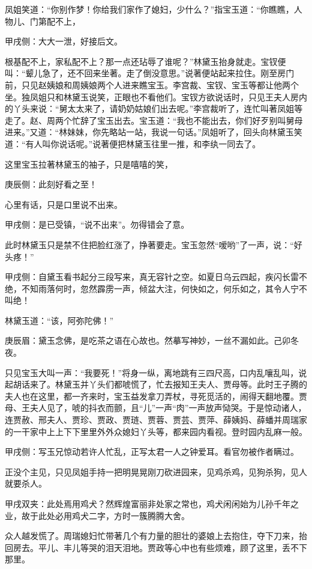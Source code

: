 \begin{parag}
    凤姐笑道：“你别作梦！你给我们家作了媳妇，少什么？”指宝玉道：“你瞧瞧，人物儿、门第配不上，\begin{note}甲戌侧：大大一泄，好接后文。\end{note}根基配不上，家私配不上？那一点还玷辱了谁呢？”林黛玉抬身就走。宝钗便叫：“颦儿急了，还不回来坐著。走了倒没意思。”说著便站起来拉住。刚至房门前，只见赵姨娘和周姨娘两个人进来瞧宝玉。李宫裁、宝钗、宝玉等都让他两个坐。独凤姐只和林黛玉说笑，正眼也不看他们。宝钗方欲说话时，只见王夫人房内的丫头来说：“舅太太来了，请奶奶姑娘们出去呢。”李宫裁听了，连忙叫著凤姐等走了。赵、周两个忙辞了宝玉出去。宝玉道：“我也不能出去，你们好歹别叫舅母进来。”又道：“林妹妹，你先略站一站，我说一句话。”凤姐听了，回头向林黛玉笑道：“有人叫你说话呢。”说著便把林黛玉往里一推，和李纨一同去了。
\end{parag}


\begin{parag}
    这里宝玉拉著林黛玉的袖子，只是嘻嘻的笑，\begin{note}庚辰侧：此刻好看之至！\end{note}心里有话，只是口里说不出来。\begin{note}甲戌侧：是已受镇，“说不出来”。勿得错会了意。\end{note}此时林黛玉只是禁不住把脸红涨了，挣著要走。宝玉忽然“嗳哟”了一声，说：“好头疼！”\begin{note}甲戌侧：自黛玉看书起分三段写来，真无容针之空。如夏日乌云四起，疾闪长雷不绝，不知雨落何时，忽然霹雳一声，倾盆大注，何快如之，何乐如之，其令人宁不叫绝！\end{note}林黛玉道：“该，阿弥陀佛！”\begin{note}庚辰眉：黛玉念佛，是吃茶之语在心故也。然摹写神妙，一丝不漏如此。己卯冬夜。\end{note}只见宝玉大叫一声：“我要死！”将身一纵，离地跳有三四尺高，口内乱嚷乱叫，说起胡话来了。林黛玉并丫头们都唬慌了，忙去报知王夫人、贾母等。此时王子腾的夫人也在这里，都一齐来时，宝玉益发拿刀弄杖，寻死觅活的，闹得天翻地覆。贾母、王夫人见了，唬的抖衣而颤，且“儿”一声“肉”一声放声恸哭。于是惊动诸人，连贾赦、邢夫人、贾珍、贾政、贾琏、贾蓉、贾芸、贾萍、薛姨妈、薛蟠并周瑞家的一干家中上上下下里里外外众媳妇丫头等，都来园内看视。登时园内乱麻一般。\begin{note}甲戌侧：写玉兄惊动若许人忙乱，正写太君一人之钟爱耳。看官勿被作者瞒过。\end{note}正没个主见，只见凤姐手持一把明晃晃刚刀砍进园来，见鸡杀鸡，见狗杀狗，见人就要杀人。\begin{note}甲戌双夹：此处焉用鸡犬？然辉煌富丽非处家之常也，鸡犬闲闲始为儿孙千年之业，故于此处必用鸡犬二字，方时一簇腾腾大舍。\end{note}众人越发慌了。周瑞媳妇忙带著几个有力量的胆壮的婆娘上去抱住，夺下刀来，抬回房去。平儿、丰儿等哭的泪天泪地。贾政等心中也有些烦难，顾了这里，丢不下那里。
\end{parag}


